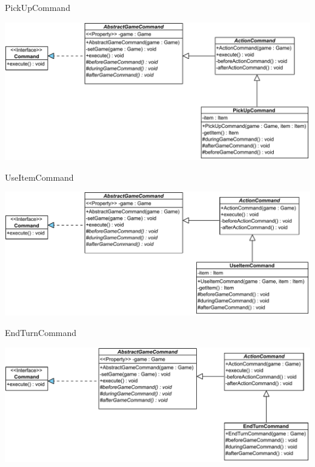 \documentclass[11pt,t]{beamer}
\begin{document}
\begin{frame}{PickUpCommand}
\begin{center}
\includegraphics[width=0.95\linewidth]{images/pickupcommand}
\end{center}
\end{frame}

\begin{frame}{UseItemCommand}
\begin{center}
\includegraphics[width=0.95\linewidth]{images/useitemcommand}
\end{center}

\end{frame}

\begin{frame}{EndTurnCommand}
\begin{center}
\includegraphics[width=0.95\linewidth]{images/endturncommand}
\end{center}
\end{frame}
\end{document}
